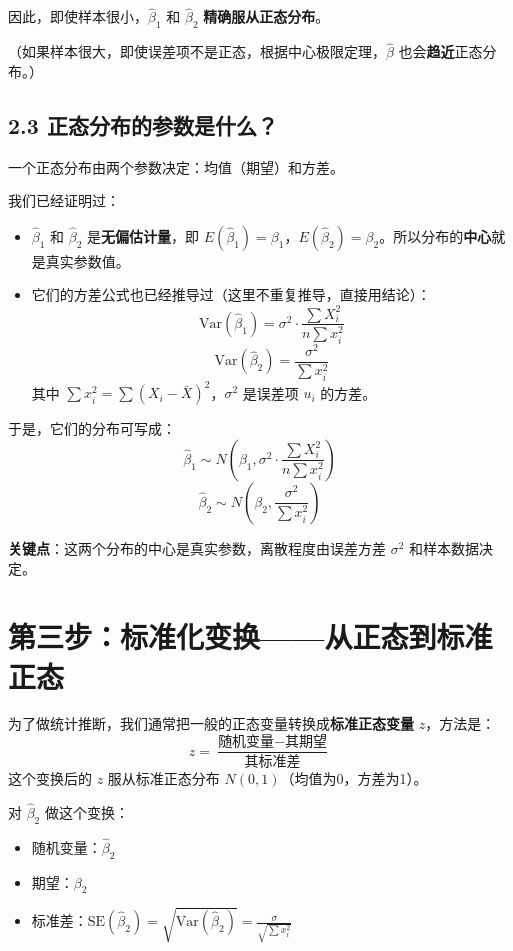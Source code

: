 \documentclass[12pt,a4paper]{ctexart}
\begin{document}
因此，即使样本很小，\(\hat{\beta}_1\) 和 \(\hat{\beta}_2\) \textbf{精确服从正态分布}。

（如果样本很大，即使误差项不是正态，根据中心极限定理，\(\hat{\beta}\) 也会\textbf{趋近}正态分布。）

\subsection*{2.3 正态分布的参数是什么？}
一个正态分布由两个参数决定：均值（期望）和方差。

我们已经证明过：
\begin{itemize}
    \item \(\hat{\beta}_1\) 和 \(\hat{\beta}_2\) 是\textbf{无偏估计量}，即 \(E(\hat{\beta}_1) = \beta_1\)，\(E(\hat{\beta}_2) = \beta_2\)。所以分布的\textbf{中心}就是真实参数值。
    \item 它们的方差公式也已经推导过（这里不重复推导，直接用结论）：
    \[
    \text{Var}(\hat{\beta}_1) = \sigma^2 \cdot \frac{\sum X_i^2}{n \sum x_i^2}
    \]
    \[
    \text{Var}(\hat{\beta}_2) = \frac{\sigma^2}{\sum x_i^2}
    \]
    其中 \(\sum x_i^2 = \sum (X_i - \bar{X})^2\)，\(\sigma^2\) 是误差项 \(u_i\) 的方差。
\end{itemize}

于是，它们的分布可写成：
\[
\hat{\beta}_1 \sim N\left(\beta_1, \sigma^2 \cdot \frac{\sum X_i^2}{n \sum x_i^2}\right)
\]
\[
\hat{\beta}_2 \sim N\left(\beta_2, \frac{\sigma^2}{\sum x_i^2}\right)
\]

\textbf{关键点}：这两个分布的中心是真实参数，离散程度由误差方差 \(\sigma^2\) 和样本数据决定。

\section*{第三步：标准化变换——从正态到标准正态}

为了做统计推断，我们通常把一般的正态变量转换成\textbf{标准正态变量} \(z\)，方法是：
\[
z = \frac{\text{随机变量} - \text{其期望}}{\text{其标准差}}
\]
这个变换后的 \(z\) 服从标准正态分布 \(N(0,1)\)（均值为0，方差为1）。

对 \(\hat{\beta}_2\) 做这个变换：
\begin{itemize}
    \item 随机变量：\(\hat{\beta}_2\)
    \item 期望：\(\beta_2\)
    \item 标准差：\(\text{SE}(\hat{\beta}_2) = \sqrt{\text{Var}(\hat{\beta}_2)} = \frac{\sigma}{\sqrt{\sum x_i^2}}\)
\end{itemize}
\end{document}
